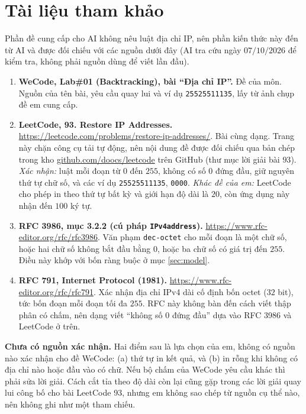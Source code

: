 \documentclass[12pt,a4paper]{article}
\begin{document}
\section{Tài liệu tham khảo}\label{sec:refs}

Phần đề cung cấp cho AI không nêu luật địa chỉ IP, nên phần kiến thức này đến từ AI và được đối chiếu với các nguồn dưới đây (AI tra cứu ngày $07/10/2026$ để kiểm tra, không phải nguồn dùng để viết lần đầu).

\begin{enumerate}
    \item \textbf{WeCode, Lab\#01 (Backtracking), bài ``Địa chỉ IP''.} Đề của môn. Nguồn của tên bài, yêu cầu quay lui và ví dụ \texttt{25525511135}, lấy từ ảnh chụp đề em cung cấp.
    \item \textbf{LeetCode, 93. Restore IP Addresses.}\\ \url{https://leetcode.com/problems/restore-ip-addresses/}. Bài cùng dạng. Trang này chặn công cụ tải tự động, nên nội dung đề được đối chiếu qua bản chép trong kho \url{github.com/doocs/leetcode} trên GitHub (thư mục lời giải bài $93$). \emph{Xác nhận:} luật mỗi đoạn từ $0$ đến $255$, không có số $0$ đứng đầu, giữ nguyên thứ tự chữ số, và các ví dụ \texttt{25525511135}, \texttt{0000}. \emph{Khác đề của em:} LeetCode cho phép in theo thứ tự bất kỳ và giới hạn độ dài là $20$, còn ứng dụng này nhận đến $100$ ký tự.
    \item \textbf{RFC 3986, mục 3.2.2 (cú pháp \texttt{IPv4address}).} \url{https://www.rfc-editor.org/rfc/rfc3986}. Văn phạm \texttt{dec-octet} cho mỗi đoạn là một chữ số, hoặc hai chữ số không bắt đầu bằng $0$, hoặc ba chữ số có giá trị đến $255$. Điều này khớp với bốn ràng buộc ở mục \ref{sec:model}.
    \item \textbf{RFC 791, Internet Protocol (1981).} \url{https://www.rfc-editor.org/rfc/rfc791}. Xác nhận địa chỉ IPv4 dài cố định bốn octet ($32$ bit), tức bốn đoạn mỗi đoạn tối đa $255$. RFC này không bàn đến cách viết thập phân có chấm, nên dạng viết ``không số $0$ đứng đầu'' dựa vào RFC 3986 và LeetCode ở trên.
\end{enumerate}

\textbf{Chưa có nguồn xác nhận.} Hai điểm sau là lựa chọn của em, không có nguồn nào xác nhận cho đề WeCode: (a) thứ tự in kết quả, và (b) in rỗng khi không có địa chỉ nào hoặc đầu vào có chữ. Nếu bộ chấm của WeCode yêu cầu khác thì phải sửa lời giải. Cách cắt tỉa theo độ dài còn lại cũng gặp trong các lời giải quay lui công bố cho bài LeetCode 93, nhưng em không sao chép từ nguồn cụ thể nào, nên không ghi như một tham chiếu.
\end{document}
